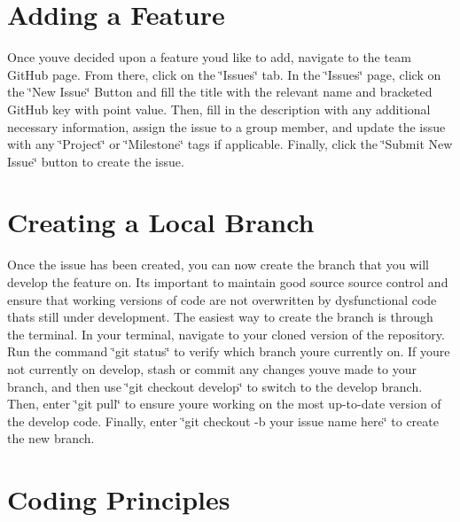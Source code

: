 \hypertarget{how_to_contribute_adding_a_feature}{}\section{Adding a Feature}\label{how_to_contribute_adding_a_feature}
Once you\textquotesingle{}ve decided upon a feature you\textquotesingle{}d like to add, navigate to the team Git\+Hub page. From there, click on the \char`\"{}\+Issues\char`\"{} tab. In the \char`\"{}\+Issues\char`\"{} page, click on the \char`\"{}\+New Issue\char`\"{} Button and fill the title with the relevant name and bracketed Git\+Hub key with point value. Then, fill in the description with any additional necessary information, assign the issue to a group member, and update the issue with any \char`\"{}\+Project\char`\"{} or \char`\"{}\+Milestone\char`\"{} tags if applicable. Finally, click the \char`\"{}\+Submit New Issue\char`\"{} button to create the issue.\hypertarget{how_to_contribute_creating_a_local_branch}{}\section{Creating a Local Branch}\label{how_to_contribute_creating_a_local_branch}
Once the issue has been created, you can now create the branch that you will develop the feature on. It\textquotesingle{}s important to maintain good source source control and ensure that working versions of code are not overwritten by dysfunctional code that\textquotesingle{}s still under development. The easiest way to create the branch is through the terminal. In your terminal, navigate to your cloned version of the repository. Run the command \char`\"{}git status\char`\"{} to verify which branch you\textquotesingle{}re currently on. If you\textquotesingle{}re not currently on \textquotesingle{}develop\textquotesingle{}, stash or commit any changes you\textquotesingle{}ve made to your branch, and then use \char`\"{}git checkout develop\char`\"{} to switch to the \textquotesingle{}develop\textquotesingle{} branch. Then, enter \char`\"{}git pull\char`\"{} to ensure you\textquotesingle{}re working on the most up-\/to-\/date version of the \textquotesingle{}develop\textquotesingle{} code. Finally, enter \char`\"{}git checkout -\/b \textquotesingle{}your issue name here\textquotesingle{}\char`\"{} to create the new branch.\hypertarget{how_to_contribute_coding_principles}{}\section{Coding Principles}\label{how_to_contribute_coding_principles}

